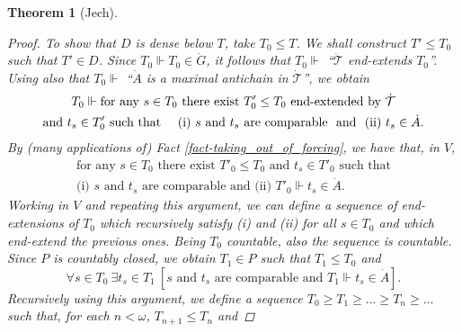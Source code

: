 \documentclass[11pt,a4paper]{report}
\newtheorem{theorem}{Theorem}[chapter] %
\theoremstyle{definition}
\theoremstyle{num.custom-title}
\theoremstyle{custom-title}
\DeclareMathOperator{\sse}{\subseteq}
\newcommand{\T}{\mathcal{T}}
\newcommand*{\defeq}{\mathrel{\rlap{%
                     \raisebox{0.3ex}{$\cdot$}}%
                     \raisebox{-0.3ex}{$\cdot$}}%
                     =}
\newcommand{\forces}{\Vdash}
\begin{document}
\begin{theorem}[Jech]
\begin{proof}
%
%
%
%

To show that $D$ is dense below $T$, take $T_0 \leq T$. We shall construct $T' \leq T_0$ such that $T' \in D$. Since $T_0 \forces T_0 \in \dot{G}$, it follows that $T_0 \forces$ ``$\dot{\T}$ end-extends $T_0$''. Using also that $T_0 \forces$ ``$\dot{A}$ is a maximal antichain in $\dot{\T}$'', we obtain
\begin{multline*}
T_0 \forces \text{for any $s \in T_0$ there exist $T'_0 \leq T_0$ end-extended by $\dot{\T}$}\\
\text{and $t_s \in T'_0$ such that \quad (i) $s$ and $t_s$ are comparable \ and \ (ii) $t_s \in \dot{A}$}.
\end{multline*}
By (many applications of) Fact \ref{fact-taking_out_of_forcing}, we have that, in $V$,
\begin{multline*}
\text{for any $s \in T_0$ there exist $T'_0 \leq T_0$ and $t_s \in T'_0$ such that}\\
\text{(i) $s$ and $t_s$ are comparable \ and \ (ii) $T'_0 \forces t_s \in \dot{A}$}.
\end{multline*}
Working in $V$ and repeating this argument, we can define a sequence of end-extensions of $T_0$ which recursively satisfy (i) and (ii) for all $s \in T_0$ and which end-extend the previous ones. Being $T_0$ countable, also the sequence is countable. Since $P$ is countably closed, we obtain $T_1 \in P$ such that $T_1 \leq T_0$ and
\[
\forall s \in T_0 \ \exists t_s \in T_1 \ [\text{$s$ and $t_s$ are comparable and $T_1 \forces t_s \in \dot{A}$}].
\]
Recursively using this argument, we define a sequence $T_0 \geq T_1 \geq \ldots \geq T_n \geq \ldots$ such that, for each $n < \omega$, $T_{n+1} \leq T_n$ and

\end{proof}
\end{theorem}
\end{document}
